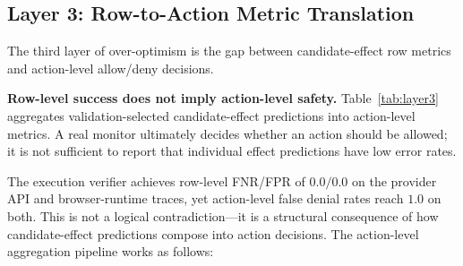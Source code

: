 \documentclass{article}
\begin{document}
\subsection{Layer 3: Row-to-Action Metric Translation}

The third layer of over-optimism is the gap between candidate-effect row metrics and action-level allow/deny decisions.

\textbf{Row-level success does not imply action-level safety.} Table~\ref{tab:layer3} aggregates validation-selected candidate-effect predictions into action-level metrics. A real monitor ultimately decides whether an action should be allowed; it is not sufficient to report that individual effect predictions have low error rates.

\begin{table}[t]
\centering
\caption{Layer 3: Action-level metrics from the same T62 validation-selected thresholds. U-Allow = Unauthorized Action Allow Rate; FDeny = Authorized Action False Denial Rate. Execution verifier can achieve row-level FNR/FPR of $0/0$ on some traces while having action-level FDeny of $1.0$.}
\label{tab:layer3}
\end{table}

The execution verifier achieves row-level FNR/FPR of $0.0/0.0$ on the provider API and browser-runtime traces, yet action-level false denial rates reach $1.0$ on both. This is not a logical contradiction---it is a structural consequence of how candidate-effect predictions compose into action decisions. The action-level aggregation pipeline works as follows:
\end{document}
